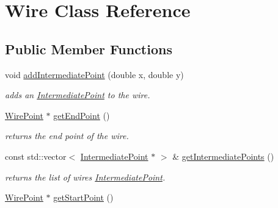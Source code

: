 \hypertarget{class_open_chams_1_1_wire}{}\section{Wire Class Reference}
\label{class_open_chams_1_1_wire}
\subsection*{Public Member Functions}
\begin{DoxyCompactItemize}
\item 
void \mbox{\hyperlink{class_open_chams_1_1_wire_aab66049b1f5ccf8de85249720152833a}{add\+Intermediate\+Point}} (double x, double y)
\begin{DoxyCompactList}\small\item\em adds an \mbox{\hyperlink{class_open_chams_1_1_intermediate_point}{Intermediate\+Point}} to the wire. \end{DoxyCompactList}\item 
\mbox{\label{class_open_chams_1_1_wire_ab1c91025a4117cede119f53d9eb8093b}} 
\mbox{\hyperlink{class_open_chams_1_1_wire_point}{Wire\+Point}} $\ast$ \mbox{\hyperlink{class_open_chams_1_1_wire_ab1c91025a4117cede119f53d9eb8093b}{get\+End\+Point}} ()
\begin{DoxyCompactList}\small\item\em returns the end point of the wire. \end{DoxyCompactList}\item 
\mbox{\label{class_open_chams_1_1_wire_aac2840e22e03db0ff2c0fe0f83c56fdd}} 
const std\+::vector$<$ \mbox{\hyperlink{class_open_chams_1_1_intermediate_point}{Intermediate\+Point}} $\ast$ $>$ \& \mbox{\hyperlink{class_open_chams_1_1_wire_aac2840e22e03db0ff2c0fe0f83c56fdd}{get\+Intermediate\+Points}} ()
\begin{DoxyCompactList}\small\item\em returns the list of wire\textquotesingle{}s \mbox{\hyperlink{class_open_chams_1_1_intermediate_point}{Intermediate\+Point}}. \end{DoxyCompactList}\item 
\mbox{\label{class_open_chams_1_1_wire_ad68ddfcb6d4cbbe3c06d03fb4350dcdb}} 
\mbox{\hyperlink{class_open_chams_1_1_wire_point}{Wire\+Point}} $\ast$ \mbox{\hyperlink{class_open_chams_1_1_wire_ad68ddfcb6d4cbbe3c06d03fb4350dcdb}{get\+Start\+Point}} ()

\end{DoxyCompactItemize}
